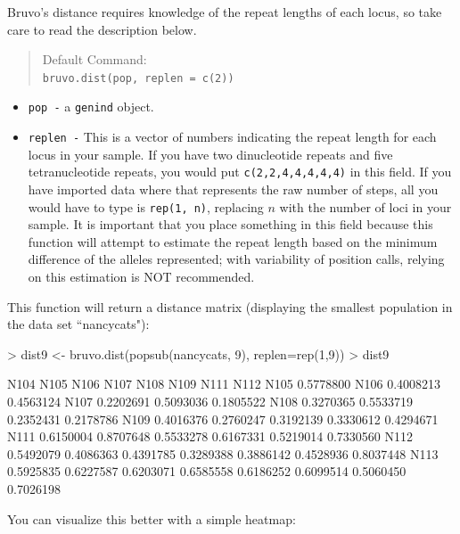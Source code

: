 \documentclass[letterpaper]{article}
\newcommand{\tab}{\hspace*{1em}}
\begin{document}
\tab\tab Bruvo's distance requires knowledge of the repeat lengths of each locus, so take care to read the description below.
\begin{quote}
Default Command:\\
\texttt{bruvo.dist(pop, replen = c(2))}
\end{quote}
\begin{itemize}
  \item \texttt{pop -} a \texttt{genind} object.
  \item \texttt{replen -} This is a vector of numbers indicating the repeat length for each locus in your sample. If you have two dinucleotide repeats and five tetranucleotide repeats, you would put \texttt{c(2,2,4,4,4,4,4)} in this field. If you have imported data where that represents the raw number of steps, all you would have to type is \texttt{rep(1, n)}, replacing $n$ with the number of loci in your sample. It is important that you place something in this field because this function will attempt to estimate the repeat length based on the minimum difference of the alleles represented; with variability of position calls, relying on this estimation is NOT recommended. 
\end{itemize}
This function will return a distance matrix (displaying the smallest population in the data set ``nancycats"):
\begin{Schunk}
\begin{Sinput}
> dist9 <- bruvo.dist(popsub(nancycats, 9), replen=rep(1,9))
> dist9
\end{Sinput}
\begin{Soutput}
          N104      N105      N106      N107      N108      N109      N111      N112
N105 0.5778800                                                                      
N106 0.4008213 0.4563124                                                            
N107 0.2202691 0.5093036 0.1805522                                                  
N108 0.3270365 0.5533719 0.2352431 0.2178786                                        
N109 0.4016376 0.2760247 0.3192139 0.3330612 0.4294671                              
N111 0.6150004 0.8707648 0.5533278 0.6167331 0.5219014 0.7330560                    
N112 0.5492079 0.4086363 0.4391785 0.3289388 0.3886142 0.4528936 0.8037448          
N113 0.5925835 0.6227587 0.6203071 0.6585558 0.6186252 0.6099514 0.5060450 0.7026198
\end{Soutput}
\end{Schunk}
You can visualize this better with a simple heatmap:
\end{document}
